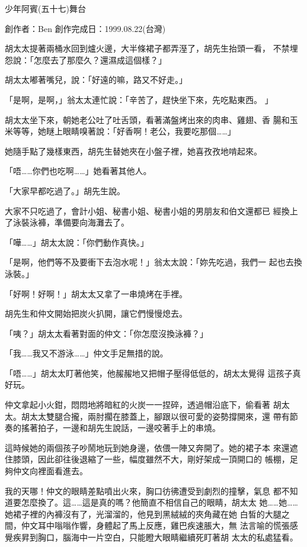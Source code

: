 



少年阿賓(五十七)舞台

創作者：Ben
創作完成日：1999.08.22(台灣)


胡太太提著兩桶水回到爐火邊，大半條裙子都弄溼了，胡先生抬頭一看，
不禁埋怨說：「怎麼去了那麼久？還濕成這個樣？」

胡太太嘟著嘴兒，說：「好遠的嘛，路又不好走。」

「是啊，是啊，」翁太太連忙說：「辛苦了，趕快坐下來，先吃點東西。
」

胡太太坐下來，朝她老公吐了吐舌頭，看著滿盤烤出來的肉串、雞翅、香
腸和玉米等等，她瞇上眼睛嗅著說：「好香啊！老公，我要吃那個……」

她隨手點了幾樣東西，胡先生替她夾在小盤子裡，她喜孜孜地啃起來。

「唔……你們也吃啊……」她看著其他人。

「大家早都吃過了。」胡先生說。

大家不只吃過了，會計小姐、秘書小姐、秘書小姐的男朋友和伯文還都已
經換上了泳裝泳褲，準備要向海灘去了。

「嘩……」胡太太說：「你們動作真快。」

「是啊，他們等不及要衝下去泡水呢！」翁太太說：「妳先吃過，我們一
起也去換泳裝。」

「好啊！好啊！」胡太太又拿了一串燒烤在手裡。

胡先生和仲文開始把炭火扒開，讓它們慢慢熄去。

「咦？」胡太太看著對面的仲文：「你怎麼沒換泳褲？」

「我……我又不游泳……」仲文手足無措的說。

「唔……」胡太太盯著他笑，他赧赧地又把帽子壓得低低的，胡太太覺得
這孩子真好玩。

仲文拿起小火鉗，悶悶地將暗紅的火炭一一捏碎，透過帽沿底下，偷看著
胡太太。胡太太雙腿合攏，兩肘擱在膝蓋上，腳跟以很可愛的姿勢撐開來，還
帶有節奏的搖著拍子，一邊和胡先生說話，一邊咬著手上的串燒。

這時候她的兩個孩子吵鬧地玩到她身邊，依偎一陣又奔開了。她的裙子本
來還遮住膝頭，因此卻往後退縮了一些，幅度雖然不大，剛好架成一頂開口的
帳棚，足夠仲文向裡面看進去。

我的天哪！仲文的眼睛差點噴出火來，胸口彷彿遭受到劇烈的撞擊，氣息
都不知道要怎麼換了。這……這是真的嗎？他簡直不相信自己的眼睛，胡太太
她……她……她裙子裡的內褲沒有了，光溜溜的，他見到黑絨絨的夾角藏在她
白皙的大腿之間，仲文耳中嗡嗡作響，身體起了馬上反應，雞巴疾速脹大，無
法言喻的慌張感覺疾昇到胸口，腦海中一片空白，只能瞪大眼睛繼續死盯著胡
太太的私處猛看。

